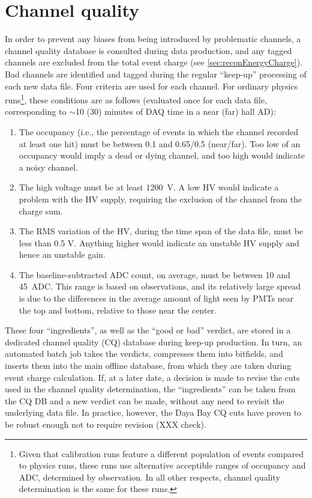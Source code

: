 \documentclass[../thesis.tex]{subfiles}
\begin{document}
\section{Channel quality}
\label{sec:calibCQ}

In order to prevent any biases from being introduced by problematic channels, a
channel quality database is consulted during data production, and any tagged
channels are excluded from the total event charge (see
\autoref{sec:reconEnergyCharge}). Bad channels are identified and tagged during
the regular ``keep-up'' processing of each new data file. Four criteria are used
for each channel. For ordinary physics runs\footnote{Given that calibration runs
  feature a different population of events compared to physics runs, these runs
  use alternative acceptible ranges of occupancy and ADC, determined by
  observation. In all other respects, channel quality determination is the same
  for these runs.}, these conditions are as follows (evaluated once for each
data file, corresponding to $\sim$10 (30) minutes of DAQ time in a near (far)
hall AD):

\begin{enumerate}
\item The occupancy (i.e., the percentage of events in which the channel
  recorded at least one hit) must be between 0.1 and 0.65/0.5 (near/far). Too
  low of an occupancy would imply a dead or dying channel, and too high would
  indicate a noisy channel.
\item The high voltage must be at least 1200~V. A low HV would indicate a
  problem with the HV supply, requiring the exclusion of the channel from the
  charge sum.
\item The RMS variation of the HV, during the time span of the data file, must
  be less than 0.5 V. Anything higher would indicate an unstable HV supply and
  hence an unstable gain.
\item The baseline-subtracted ADC count, on average, must be between 10 and
  45~ADC. This range is based on observations, and its relatively large spread
  is due to the differences in the average amount of light seen by PMTs near the
  top and bottom, relative to those near the center.
\end{enumerate}

These four ``ingredients'', as well as the ``good or bad'' verdict, are stored
in a dedicated channel quality (CQ) database during keep-up production. In turn,
an automated batch job takes the verdicts, compresses them into bitfields, and
inserts them into the main offline database, from which they are taken during
event charge calculation. If, at a later date, a decision is made to revise the
cuts used in the channel quality determination, the ``ingredients'' can be taken
from the CQ DB and a new verdict can be made, without any need to revisit the
underlying data file. In practice, however, the Daya Bay CQ cuts have proven to
be robust enough not to require revision (XXX check).

\subfilebackmatter
\end{document}
